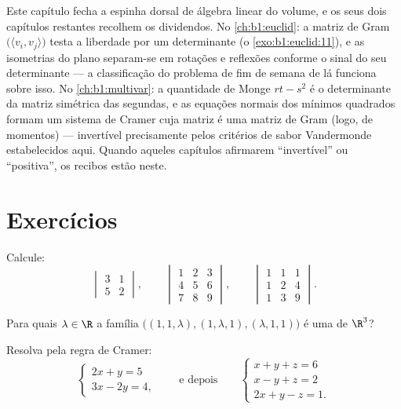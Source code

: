 \begin{remark}
\label{rem:b1:det:perspectives}
Este capítulo fecha a espinha dorsal de álgebra linear do volume, e
os seus dois capítulos restantes recolhem os dividendos. No
\cref{ch:b1:euclid}: a matriz de Gram $\bigl(\langle v_i, v_j\rangle\bigr)$ testa a liberdade por um determinante
(o \cref{exo:b1:euclid:11}), e as isometrias do plano separam-se em rotações e
reflexões conforme o sinal do seu determinante --- a classificação
do problema de fim de semana de lá funciona sobre isso. No \cref{ch:b1:multivar}: a
quantidade de Monge $rt -
s^2$ é o determinante da matriz simétrica das
 segundas, e as equações normais dos mínimos quadrados
formam um sistema de Cramer cuja matriz é uma matriz de Gram (logo,
de momentos) --- invertível precisamente pelos critérios de sabor
Vandermonde estabelecidos aqui. Quando aqueles capítulos afirmarem
``invertível'' ou ``positiva'', os recibos estão neste.
\end{remark}

\section{Exercícios}

\begin{exercise}[$\star$]\label{exo:b1:det:1}
Calcule:
\[
\begin{vmatrix} 3 & 1\\ 5 & 2 \end{vmatrix},
\qquad
\begin{vmatrix} 1 & 2 & 3\\ 4 & 5 & 6\\ 7 & 8 & 9\end{vmatrix},
\qquad
\begin{vmatrix} 1 & 1 & 1\\ 1 & 2 & 4\\ 1 & 3 & 9\end{vmatrix}.
\]
\end{exercise}

\begin{exercise}[$\star$]\label{exo:b1:det:2}
Para quais $\lambda \in \R$ a família $\bigl((1, 1, \lambda),
(1, \lambda, 1), (\lambda, 1, 1)\bigr)$ é uma  de $\R^3$?
\end{exercise}

\begin{exercise}[$\star$]\label{exo:b1:det:3}
Resolva pela regra de Cramer:
\[
\begin{cases}
2x + y = 5\\
3x - 2y = 4 ,
\end{cases}
\qquad\text{e depois}\qquad
\begin{cases}
x + y + z = 6\\
x - y + z = 2\\
2x + y - z = 1 .
\end{cases}
\]
\end{exercise}

